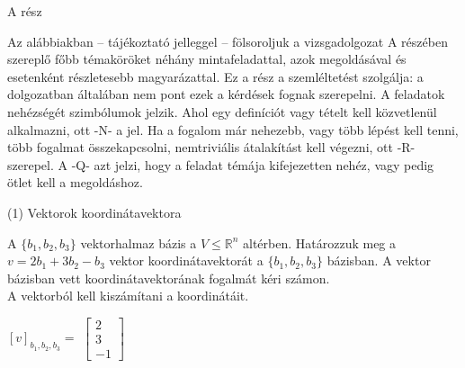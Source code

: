 

\begin{frame}[plain]
\begin{tcolorbox}[center, colback={myyellow}, coltext={black}, colframe={myyellow}]
    {\RHuge  A rész}
    \mmedskip
\end{tcolorbox}
\end{frame}

\begin{frame}
  \begin{tcolorbox}
Az alábbiakban – tájékoztató jelleggel – fölsoroljuk a vizsgadolgozat A részében szereplő főbb témaköröket néhány mintafeladattal, azok megoldásával és esetenként részletesebb magyarázattal. Ez a rész a szemléltetést szolgálja: a dolgozatban általában nem pont ezek a kérdések fognak szerepelni. A feladatok nehézségét szimbólumok jelzik. Ahol egy definíciót vagy tételt kell közvetlenül alkalmazni, ott -N- a jel. Ha a fogalom már nehezebb, vagy több lépést kell tenni, több fogalmat összekapcsolni, nemtriviális átalakítást kell végezni, ott -R- szerepel. A -Q- azt jelzi, hogy a feladat témája kifejezetten nehéz, vagy pedig ötlet kell a megoldáshoz.
  \end{tcolorbox}
\end{frame}

\begin{frame}[plain]
\begin{tcolorbox}[center, colback={myyellow}, coltext={black}, colframe={myyellow}]
    {\RHuge  (1) Vektorok koordinátavektora}
    \mmedskip
\end{tcolorbox}
\end{frame}

\begin{frame}
  \begin{tcolorbox}[title={1/1. -N-}]
      A $\{b_1,b_2,b_3\}$ vektorhalmaz bázis a $V \leq \mathbb{R}^n$ altérben. Határozzuk meg a $v = 2b_1 + 3b_2 -b_3$ vektor koordinátavektorát a $\{b_1,b_2,b_3\}$ bázisban.
  \tcblower
    A vektor bázisban vett koordinátavektorának fogalmát kéri számon.\\
    
    A vektorból kell kiszámítani a koordinátáit.\\
    \mmedskip 
  
   $[v]_{b_1,b_2,b_3} =$ $\begin{bmatrix} 
  				2  \\
  				3 \\
  				-1
			\end{bmatrix}$
  \end{tcolorbox}
\end{frame}

